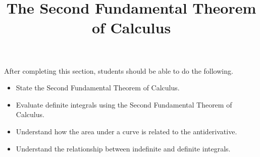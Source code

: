 \documentclass{ximera}
\title{The Second Fundamental Theorem of Calculus}
\begin{document}
\begin{abstract}
\end{abstract}

\maketitle

\begin{sectionOutcomes}

After completing this section, students should be able to do the following.

\begin{itemize}
	\item State the Second Fundamental Theorem of Calculus.
	\item Evaluate definite integrals using the Second Fundamental Theorem of Calculus.
	\item Understand how the area under a curve is related to the antiderivative.
	\item Understand the relationship between indefinite and definite integrals.
\end{itemize}

\end{sectionOutcomes}
\end{document}
